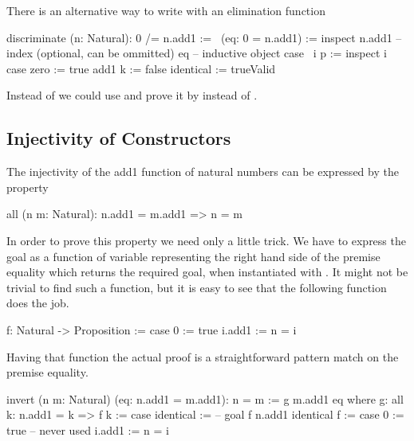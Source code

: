 There is an alternative way to write  with an elimination
function

\begin{alba}
    discriminate (n: Natural): 0 /= n.add1 :=
        \ (eq: 0 = n.add1) :=
            inspect
                n.add1     -- index (optional, can be ommitted)
                eq              -- inductive object
            case
                {\ i p :=
                    inspect i case
                        zero := true
                        add1 k := false}
                identical := trueValid
\end{alba}

Instead of  we could use  and
prove it by  instead of .




\subsection{Injectivity of Constructors}

The injectivity of the add1 function of natural numbers can be expressed
by the property

\begin{alba}
    all (n m: Natural): n.add1 = m.add1  =>  n = m
\end{alba}

In order to prove this property we need only a little trick. We have to
express the goal  as a function of variable representing the right
hand side of the premise equality which returns the required goal, when
instantiated with . It might not be trivial to find such a
function, but it is easy to see that the following function does the job.

\begin{alba}
    f: Natural -> Proposition :=
        case 0 :=
                true
             i.add1 :=
                n = i
\end{alba}
%
Having that function the actual proof is a straightforward pattern match on the
premise equality.


\begin{alba}
    invert (n m: Natural) (eq: n.add1 = m.add1): n = m
    :=
        g m.add1 eq
        where
            g: all k: n.add1 = k => f k :=
                case identical :=
                    -- goal f n.add1
                    identical
            f :=
                case
                    0 :=
                        true -- never used
                    i.add1 :=
                        n = i
\end{alba}


